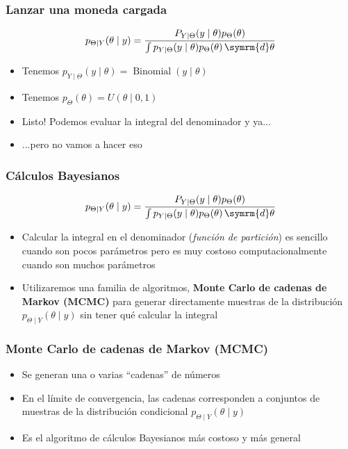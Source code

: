 \documentclass[xcolor=dvipsnames,10pt]{beamer}
\begin{document}
%
\begin{frame}
  \frametitle{Lanzar una moneda cargada}
  \begin{equation*}
    p_{\Theta \mid Y}(\theta \mid y) = \frac{P_{Y \mid \Theta}(y \mid \theta) p_{\Theta}(\theta)}{\int p_{Y \mid \Theta}(y \mid \theta) p_{\Theta}(\theta) \, \symrm{d} \theta}
  \end{equation*}
  \begin{itemize}
  \item Tenemos $p_{Y \mid \Theta}(y \mid \theta) = \operatorname{Binomial}(y \mid \theta)$
  \item Tenemos $p_{\Theta}(\theta) = U(\theta \mid 0, 1)$
  \item Listo! Podemos evaluar la integral del denominador y ya...
  \item ...pero no vamos a hacer eso
  \end{itemize}
\end{frame}
%
\begin{frame}
  \frametitle{Cálculos Bayesianos}
  \begin{equation*}
    p_{\Theta \mid Y}(\theta \mid y) = \frac{P_{Y \mid \Theta}(y \mid \theta) p_{\Theta}(\theta)}{\int p_{Y \mid \Theta}(y \mid \theta) p_{\Theta}(\theta) \, \symrm{d} \theta}
  \end{equation*}
  \begin{itemize}
  \item Calcular la integral en el denominador (\emph{función de partición}) es sencillo cuando son pocos parámetros pero es muy costoso computacionalmente cuando son muchos parámetros
  \item Utilizaremos una familia de algoritmos, \textbf{Monte Carlo de cadenas de Markov (MCMC)} para generar directamente muestras de la distribución $p_{\Theta \mid Y}(\theta \mid y)$ sin tener qué calcular la integral
  \end{itemize}
\end{frame}
%
\begin{frame}
  \frametitle{Monte Carlo de cadenas de Markov (MCMC)}
  \begin{itemize}
  \item Se generan una o varias ``cadenas'' de números
  \item En el límite de convergencia, las cadenas corresponden a conjuntos de muestras de la distribución condicional $p_{\Theta \mid Y}(\theta \mid y)$
  \item Es el algoritmo de cálculos Bayesianos más costoso y más general
  \end{itemize}
\end{frame}
\end{document}
